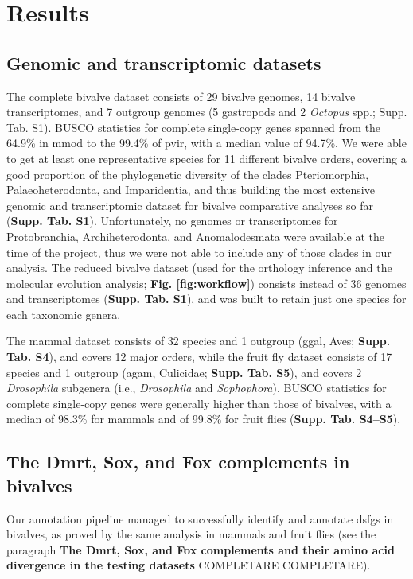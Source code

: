 \documentclass[../main.tex]{subfiles}
\begin{document}
\section{Results} \label{chapter3_results}
\subsection{Genomic and transcriptomic datasets}
The complete bivalve dataset consists of 29 bivalve genomes, 14 bivalve transcriptomes, and 7 outgroup genomes (5 gastropods and 2 \textit{Octopus} spp.; Supp. Tab. S1). BUSCO statistics for complete single-copy genes spanned from the 64.9\% in \gls{mmod} to the 99.4\% of \gls{pvir}, with a median value of 94.7\%. We were able to get at least one representative species for 11 different bivalve orders, covering a good proportion of the phylogenetic diversity of the clades Pteriomorphia, Palaeoheterodonta, and Imparidentia, and thus building the most extensive genomic and transcriptomic dataset for bivalve comparative analyses so far (\textbf{Supp. Tab. S1}). Unfortunately, no genomes or transcriptomes for Protobranchia, Archiheterodonta, and Anomalodesmata were available at the time of the project, thus we were not able to include any of those clades in our analysis. The reduced bivalve dataset (used for the orthology inference and the molecular evolution analysis; \textbf{Fig. \ref{fig:workflow}}) consists instead of 36 genomes and transcriptomes (\textbf{Supp. Tab. S1}), and was built to retain just one species for each taxonomic genera.

The mammal dataset consists of 32 species and 1 outgroup (\gls{ggal}, Aves; \textbf{Supp. Tab. S4}), and covers 12 major orders, while the fruit fly dataset consists of 17 species and 1 outgroup (\gls{agam}, Culicidae; \textbf{Supp. Tab. S5}), and covers 2 \textit{Drosophila} subgenera (i.e., \textit{Drosophila} and \textit{Sophophora}). BUSCO statistics for complete single-copy genes were generally higher than those of bivalves, with a median of 98.3\% for mammals and of 99.8\% for fruit flies (\textbf{Supp. Tab. S4--S5}).

\subsection{The Dmrt, Sox, and Fox complements in bivalves}
Our annotation pipeline managed to successfully identify and annotate \glspl{dsfg} in bivalves, as proved by the same analysis in mammals and fruit flies (see the paragraph \textbf{The Dmrt, Sox, and Fox complements and their amino acid divergence in the testing datasets} COMPLETARE COMPLETARE).
\end{document}
